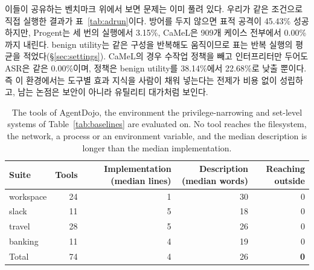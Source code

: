 \documentclass[acmsmall,screen,review,anonymous]{acmart}
\begin{document}
이들이 공유하는 벤치마크 위에서 보면 문제는 이미 풀려 있다. 우리가 같은 조건으로 직접 실행한 결과가 표~\ref{tab:adrun}이다. 방어를 두지 않으면 표적 공격이 45.43\% 성공하지만, Progent는 세 번의 실행에서 3.15\%, CaMeL은 909개 케이스 전부에서 0.00\%까지 내린다. benign utility는 같은 구성을 반복해도 움직이므로 표는 반복 실행의 평균을 적었다(\S\ref{sec:settings}). CaMeL의 경우 수작업 정책을 빼고 인터프리터만 두어도 ASR은 같은 0.00\%이며, 정책은 benign utility를 38.14\%에서 22.68\%로 낮출 뿐이다. 즉 이 환경에서는 도구별 효과 지식을 사람이 채워 넣는다는 전제가 비용 없이 성립하고, 남는 논점은 보안이 아니라 유틸리티 대가처럼 보인다.

\begin{table}[h]
\caption{The tools of AgentDojo, the environment the privilege-narrowing and set-level systems of Table~\ref{tab:baselines} are evaluated on. No tool reaches the filesystem, the network, a process or an environment variable, and the median description is longer than the median implementation.}
\label{tab:adtools}
\small
\begin{tabular}{lrrrr}
\toprule
Suite & Tools & Implementation (median lines) & Description (median words) & Reaching outside \\
\midrule
workspace & 24 & 1 & 30 & 0 \\
slack     & 11 & 5 & 18 & 0 \\
travel    & 28 & 5 & 26 & 0 \\
banking   & 11 & 4 & 19 & 0 \\
\midrule
Total     & 74 & 4 & 26 & \textbf{0} \\
\bottomrule
\end{tabular}
\end{table}
\end{document}
